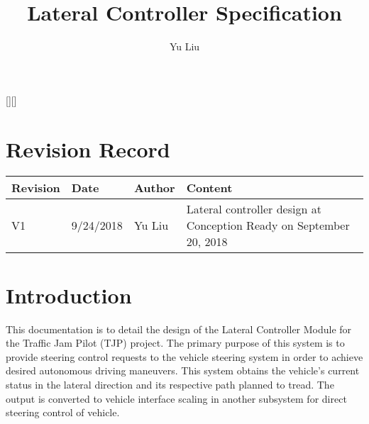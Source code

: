 \documentclass[11pt,letterpaper]{report}
\begin{document}
\newtheorem{lem}{\bf Lemma}%
\newtheorem{rem}{\bf Remark}%
\newtheorem{pro}{\bf Proposition}%
\newtheorem{defn}{\bf Definition}%
\newtheorem{thm}{\bf Theorem}%
\newtheorem{assu}{Assumption}%
\newcommand{\tr}{{\rm tr}}
\newcommand{\ts}{& \hspace{-0.05in}}
\newcommand{\nn}{\nonumber}
\newtheorem{ex}{Example}[section]
\newcommand{\bp}{\bigskip}
\newcommand{\slp}{\smallskip}
\newcommand{\diag}{{\rm diag}}
\newcommand{\sign}{{\rm sign}}

\newcommand{\rank}{{\rm rank}}
\newcommand{\qed}{\hfill \ensuremath{\Box}}

[][\FBwidth]

\title{\bf \LARGE Lateral Controller Specification}

\author{Yu Liu}

\date{}
\maketitle

\chapter*{Revision Record}
\begin{table}[ht]
  \centering
  \begin{tabular}{|p{3cm}| p{3cm}| p{3cm}| p{7cm}|}
    \hline
    {\bf Revision}& {\bf Date}& {\bf Author}& {\bf Content} \\
    \hline
    V1      & 9/24/2018 & Yu Liu & Lateral controller design at
                                   Conception Ready on September 20,
                                   2018\\
    \hline
                                
  \end{tabular}
\end{table}


\newpage
\tableofcontents
\newpage

\chapter{ Introduction}
This documentation is to detail the design of the Lateral Controller
Module for the Traffic Jam Pilot (TJP) project. The primary purpose of
this system is to provide steering control requests to the vehicle
steering system in order to achieve desired autonomous driving
maneuvers. This system obtains the vehicle's current status in the
lateral direction and its respective path planned to tread. The output
is converted to vehicle interface scaling in another subsystem for
direct steering control of vehicle.
\end{document}
